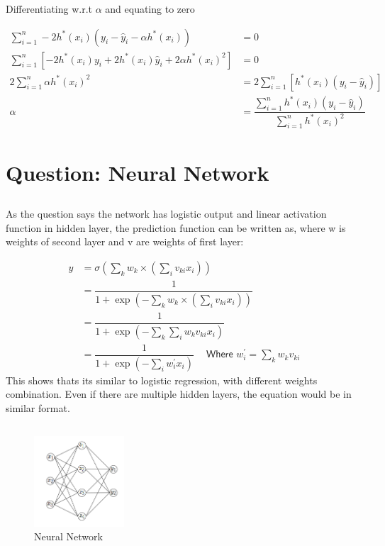 \documentclass[paper=a4, fontsize=11pt]{scrartcl} %
\numberwithin{equation}{section} %
\numberwithin{figure}{section} %
\numberwithin{table}{section} %
\begin{document}
Differentiating w.r.t $\alpha$ and equating to zero

\begin{align*}
\sum_{i=1}^{n} -2h^{*}(x_{i})(y_{i} - \hat{y}_{i} - \alpha h^{*}(x_{i})) &=0\\
\sum_{i=1}^{n} [-2h^{*}(x_{i})y_{i} + 2h^{*}(x_{i})\hat{y}_{i} + 2\alpha h^{*}(x_{i})^{2}] &=0 \\
2\sum_{i=1}^{n} \alpha h^{*}(x_{i})^{2} &= 2\sum_{i=1}^{n}[h^{*}(x_{i}) (y_{i} - \hat{y}_{i})]\\
\alpha &= \dfrac{\sum_{i=1}^{n}h^{*}(x_{i}) (y_{i} - \hat{y}_{i})}{\sum_{i=1}^{n} h^{*}(x_{i})^{2}}
\end{align*}



\section{Question: Neural Network}
\subsection{}
As the question says the network has logistic output and linear activation function in hidden layer, the prediction function can be written as, where w is weights of second layer and v are weights of first layer:

\begin{align*}
y &= \sigma (\sum_{k}w_{k} \times (\sum_{i}v_{ki}x_{i}))\\
&= \dfrac{1}{1 + \exp(-\sum_{k}w_{k} \times (\sum_{i}v_{ki}x_{i}))}\\
&= \dfrac{1}{1 + \exp(-\sum_{k}\sum_{i}w_{k}v_{ki}x_{i})}\\
& = \dfrac{1}{1 + \exp(-\sum_{i}w_{i}^{'}x_{i})}~~~~
\textsf{ Where $w_{i}^{'} = \sum_{k}w_{k}v_{ki}$}
\end{align*}
This shows thats its similar to logistic regression, with different weights combination. Even if there are multiple hidden layers, the equation would be in similar format.

\subsection{}
\begin{figure}[h!]
  \centering
    \includegraphics[width=0.3\textwidth]{../figures/neuralNetwork.png}
  \caption{Neural Network}
\end{figure}
\end{document}
